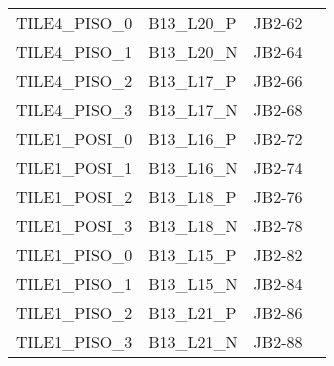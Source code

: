\documentclass[12pt]{article}
\begin{document}
\begin{tabular}{llll}
\hline
TILE4\_PISO\_0     & B13\_L20\_P  & JB2-62 & \\
TILE4\_PISO\_1     & B13\_L20\_N  & JB2-64 & \\
TILE4\_PISO\_2     & B13\_L17\_P  & JB2-66 & \\
TILE4\_PISO\_3     & B13\_L17\_N  & JB2-68 & \\
\hline
TILE1\_POSI\_0     & B13\_L16\_P  & JB2-72 & \\
TILE1\_POSI\_1     & B13\_L16\_N  & JB2-74 & \\
TILE1\_POSI\_2     & B13\_L18\_P  & JB2-76 & \\
TILE1\_POSI\_3     & B13\_L18\_N  & JB2-78 & \\
\hline
TILE1\_PISO\_0     & B13\_L15\_P  & JB2-82& \\
TILE1\_PISO\_1     & B13\_L15\_N  & JB2-84& \\
TILE1\_PISO\_2     & B13\_L21\_P  & JB2-86& \\
TILE1\_PISO\_3     & B13\_L21\_N  & JB2-88& \\
\hline
\end{tabular}
\end{document}
